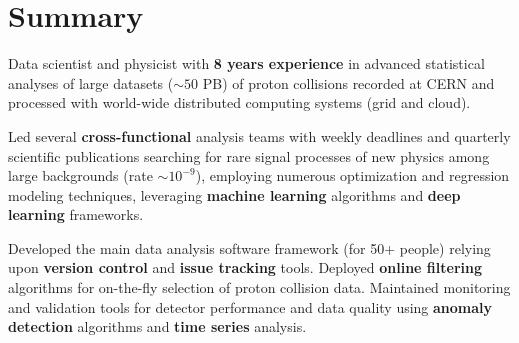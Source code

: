 \documentclass{myfancycv}
\begin{document}
\makeheader
\vspace*{-.35em}

  \vspace*{-0.5em}
\section{Summary}

Data scientist and physicist with {\bf 8 years experience} in advanced statistical analyses of large datasets ($\sim50$ PB) of proton collisions recorded at CERN and processed with world-wide distributed computing systems (grid and cloud).

Led several {\bf cross-functional} analysis teams with weekly deadlines and quarterly scientific publications searching for rare signal processes of new physics among large backgrounds (rate $\sim10^{-9}$), employing numerous optimization and regression modeling techniques, leveraging {\bf machine learning} algorithms and {\bf deep learning} frameworks.

Developed the main data analysis software framework (for 50+ people) relying upon {\bf version control} and
{\bf issue tracking} tools. Deployed {\bf online filtering} algorithms for on-the-fly selection of proton collision data.
 Maintained monitoring and validation tools for detector performance and data quality using {\bf anomaly detection} algorithms and {\bf time series} analysis.


\end{document}
